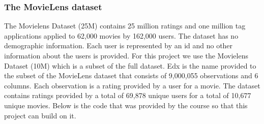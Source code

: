 \documentclass[
]{article}
\begin{document}
\hypertarget{the-movielens-dataset}{%
\subsubsection{The MovieLens dataset}\label{the-movielens-dataset}}

The Movielens Dataset (25M) contains 25 million ratings and one million
tag applications applied to 62,000 movies by 162,000 users. The dataset
has no demographic information. Each user is represented by an id and no
other information about the users is provided. For this project we use
the Movielens Dataset (10M) which is a subset of the full dataset. Edx
is the name provided to the subset of the MovieLens dataset that
consists of 9,000,055 observations and 6 columns. Each observation is a
rating provided by a user for a movie. The dataset contains ratings
provided by a total of 69,878 unique users for a total of 10,677 unique
movies. Below is the code that was provided by the course so that this
project can build on it.
\end{document}
